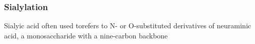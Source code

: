 \subsubsection {Sialylation}
Sialyic acid often used torefers to N- or O-substituted derivatives of neuraminic acid, a monosaccharide with a nine-carbon backbone